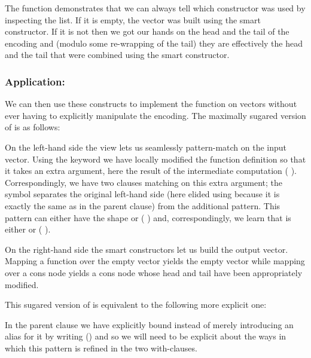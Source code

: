 The function  demonstrates that we can always tell which
constructor was used by inspecting the  list. If it
is empty, the vector was built using the  smart constructor.
If it is not then we got our hands on the head and the tail of the encoding
and (modulo some re-wrapping of the tail) they are effectively the head and the
tail that were combined using the smart constructor.

\subsubsection{Application: }

We can then use these constructs to implement the function 
on vectors without ever having to explicitly manipulate the encoding.
%
The maximally sugared version of  is as follows:


On the left-hand side the view lets us seamlessly pattern-match on the input
vector.
%
Using the  keyword we have locally modified the function
definition so that it takes an extra argument, here the result of the intermediate
computation ( ).
%
Correspondingly, we have two clauses matching on this extra argument;
the symbol \IdrisKeyword{|} separates the original left-hand side
(here elided using \IdrisKeyword{\KatlaUnderscore{}} because it is exactly the
same as in the parent clause) from the additional pattern.
%
This pattern can
either have the shape \IdrisData{[]} or ( \IdrisData{::} )
and, correspondingly, we learn that  is either \IdrisFunction{[]} or
( \IdrisFunction{::} ).

On the right-hand side the smart constructors let us build the output vector.
Mapping a function over the empty vector yields the empty vector while mapping
over a cons node yields a cons node whose head and tail have been appropriately
modified.


This sugared version of  is equivalent to the following more
explicit one:


In the parent clause we have explicitly bound 
instead of merely introducing an alias for it by writing
{(\IdrisKeyword{\_})}
and so we will need to be explicit about the ways in which this
pattern is refined in the two with-clauses.


